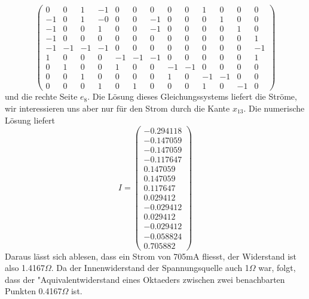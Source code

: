 \begin{loesung}
\[\begin{pmatrix}
   0&  0&  1& -1&  0&  0&  0&  0&  0&  1&  0&  0&  0\\
  -1&  0&  1& -0&  0&  0& -1&  0&  0&  0&  1&  0&  0\\
  -1&  0&  0&  1&  0&  0& -1&  0&  0&  0&  0&  1&  0\\
  -1&  0&  0&  0&  0&  0&  0&  0&  0&  0&  0&  0&  1\\
  -1& -1& -1& -1&  0&  0&  0&  0&  0&  0&  0&  0& -1\\
   1&  0&  0&  0& -1& -1& -1&  0&  0&  0&  0&  0&  1\\
   0&  1&  0&  0&  1&  0&  0& -1& -1&  0&  0&  0&  0\\
   0&  0&  1&  0&  0&  0&  0&  1&  0& -1& -1&  0&  0\\
   0&  0&  0&  1&  0&  1&  0&  0&  0&  1&  0& -1&  0
\end{pmatrix}
\]
%
%
und die rechte Seite $e_8$. Die Lösung dieses Gleichungssystems liefert die
Ströme, wir interessieren uns aber nur für den Strom durch die
Kante $x_{13}$. Die numerische Lösung liefert
\[
I=\begin{pmatrix}
  -0.294118\\
  -0.147059\\
  -0.147059\\
  -0.117647\\
   0.147059\\
   0.147059\\
   0.117647\\
   0.029412\\
  -0.029412\\
   0.029412\\
  -0.029412\\
  -0.058824\\
   0.705882
\end{pmatrix}
\]
Daraus lässt sich ablesen, dass ein Strom von 705mA fliesst,
der Widerstand ist also 1.4167$\Omega$. Da der Innenwiderstand
der Spannungsquelle auch 1$\Omega$ war, folgt, dass der "Aquivalentwiderstand
eines Oktaeders zwischen zwei benachbarten Punkten 0.4167$\Omega$ ist.
\end{loesung}


